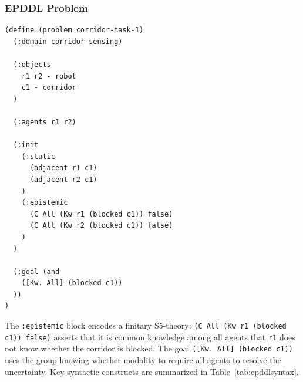 \documentclass[12pt,a4paper]{article}
\theoremstyle{definition}
\theoremstyle{plain}
\begin{document}
\subsubsection{EPDDL Problem}

\begin{lstlisting}[language={}, caption={EPDDL problem instance using a finitary S5-theory
for the initial epistemic state (\texttt{corridor\_task.epddl}).}, label=lst:epddlproblem]
(define (problem corridor-task-1)
  (:domain corridor-sensing)

  (:objects
    r1 r2 - robot
    c1 - corridor
  )

  (:agents r1 r2)

  (:init
    (:static
      (adjacent r1 c1)
      (adjacent r2 c1)
    )
    (:epistemic
      (C All (Kw r1 (blocked c1)) false)
      (C All (Kw r2 (blocked c1)) false)
    )
  )

  (:goal (and
    ([Kw. All] (blocked c1))
  ))
)
\end{lstlisting}

The \texttt{:epistemic} block encodes a finitary S5-theory:
\texttt{(C All (Kw r1 (blocked c1)) false)} asserts that it is common knowledge among all agents
that \texttt{r1} does not know whether the corridor is blocked. The goal
\texttt{([Kw. All] (blocked c1))} uses the group knowing-whether modality to require all agents
to resolve the uncertainty. Key syntactic constructs are summarized in
Table~\ref{tab:epddlsyntax}.
\end{document}
